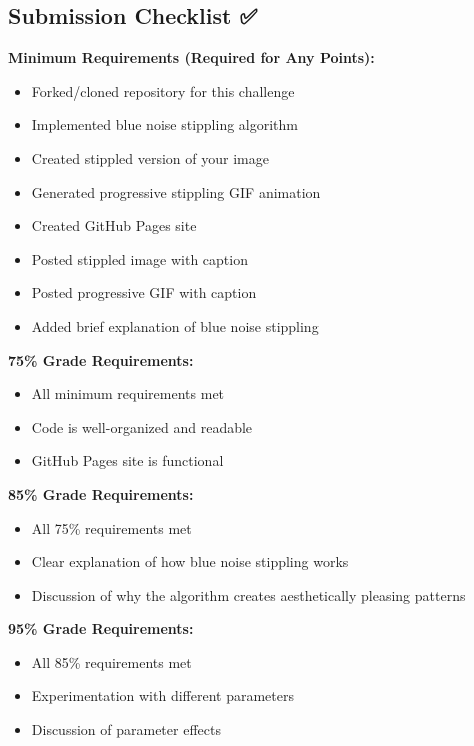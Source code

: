 \documentclass[
  letterpaper,
  DIV=11,
  numbers=noendperiod]{scrartcl}
\providecommand{\tightlist}{%
  \setlength{\itemsep}{0pt}\setlength{\parskip}{0pt}}
\begin{document}
\subsection{Submission Checklist ✅}\label{submission-checklist}

\textbf{Minimum Requirements (Required for Any Points):}

\begin{itemize}
\tightlist
\item[$\square$]
  Forked/cloned repository for this challenge
\item[$\square$]
  Implemented blue noise stippling algorithm
\item[$\square$]
  Created stippled version of your image
\item[$\square$]
  Generated progressive stippling GIF animation
\item[$\square$]
  Created GitHub Pages site
\item[$\square$]
  Posted stippled image with caption
\item[$\square$]
  Posted progressive GIF with caption
\item[$\square$]
  Added brief explanation of blue noise stippling
\end{itemize}

\textbf{75\% Grade Requirements:}

\begin{itemize}
\tightlist
\item[$\square$]
  All minimum requirements met
\item[$\square$]
  Code is well-organized and readable
\item[$\square$]
  GitHub Pages site is functional
\end{itemize}

\textbf{85\% Grade Requirements:}

\begin{itemize}
\tightlist
\item[$\square$]
  All 75\% requirements met
\item[$\square$]
  Clear explanation of how blue noise stippling works
\item[$\square$]
  Discussion of why the algorithm creates aesthetically pleasing
  patterns
\end{itemize}

\textbf{95\% Grade Requirements:}

\begin{itemize}
\tightlist
\item[$\square$]
  All 85\% requirements met
\item[$\square$]
  Experimentation with different parameters
\item[$\square$]
  Discussion of parameter effects
\end{itemize}
\end{document}
